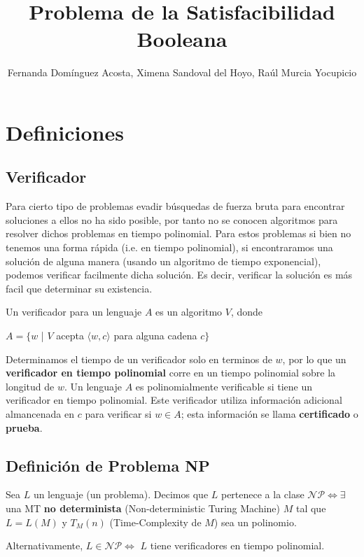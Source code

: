 \documentclass[a4paper]{article}
\title{Problema de la Satisfacibilidad Booleana}
\author{Fernanda Domínguez Acosta, Ximena Sandoval del Hoyo, Raúl Murcia Yocupicio}
\begin{document}
\maketitle


\section{Definiciones}

\subsection{Verificador}
Para cierto tipo de problemas evadir búsquedas de fuerza bruta para encontrar
soluciones a ellos no ha sido posible, por tanto no se conocen algoritmos para
resolver dichos problemas en tiempo polinomial.
Para estos problemas si bien no tenemos una forma rápida (i.e. en tiempo
polinomial), si encontraramos una solución de alguna manera (usando un algoritmo
de tiempo exponencial), podemos verificar facilmente dicha solución.
Es decir, verificar la solución es más facil que determinar su existencia.

Un verificador para un lenguaje $A$ es un algoritmo $V$, donde
\begin{center}
$A = \{w$ | $V$ acepta $\langle w, c\rangle$ para alguna cadena $c\}$
\end{center}
Determinamos el tiempo de un verificador solo en terminos de $w$, por lo que un
\textbf{verificador en tiempo polinomial} corre en un tiempo polinomial sobre la
longitud de $w$. Un lenguaje $A$ es polinomialmente verificable si tiene un
verificador en tiempo polinomial.
Este verificador utiliza información adicional almancenada en $c$ para verificar
si $w \in A$; esta información se llama \textbf{certificado} o \textbf{prueba}.

\subsection{Definición de Problema NP}

Sea $L$ un lenguaje (un problema). Decimos que $L$ pertenece a la clase
$\mathcal{NP} \Leftrightarrow \exists$ una MT \textbf{no determinista}
(Non-deterministic Turing Machine) $M$ tal que $L = L(M)$ y $T_M(n)$
(Time-Complexity de $M$) sea un polinomio.

Alternativamente, $L \in \mathcal{NP} \Leftrightarrow$ $L$ tiene verificadores
en tiempo polinomial.
\end{document}
